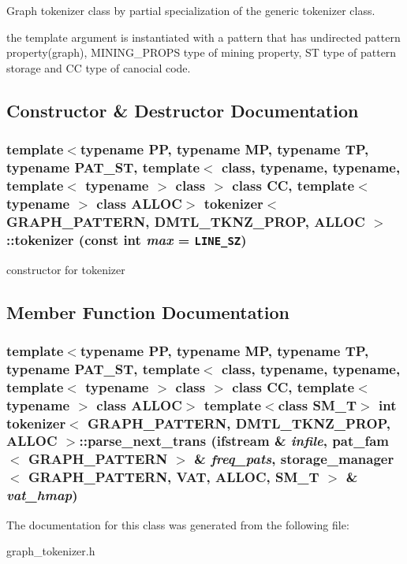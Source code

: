 Graph tokenizer class by partial specialization of the generic tokenizer class. 

the template argument is instantiated with a pattern that has undirected pattern property(graph), MINING\_\-PROPS type of mining property, ST type of pattern storage and CC type of canocial code. 



\subsection{Constructor \& Destructor Documentation}
\subsubsection{\setlength{\rightskip}{0pt plus 5cm}template$<$typename PP, typename MP, typename TP, typename PAT\_\-ST, template$<$ class, typename, typename, template$<$ typename $>$ class $>$ class CC, template$<$ typename $>$ class ALLOC$>$ \bf{tokenizer}$<$ GRAPH\_\-PATTERN, DMTL\_\-TKNZ\_\-PROP, ALLOC $>$::\bf{tokenizer} (const int {\em max} = {\tt LINE\_\-SZ})\hspace{0.3cm}{\tt  [inline]}}\label{classtokenizer_3_01GRAPH__PATTERN_00_01DMTL__TKNZ__PROP_00_01ALLOC_01_4_6b534e815d9b7bc6db390545b83f9ed5}


constructor for tokenizer 

\subsection{Member Function Documentation}
\subsubsection{\setlength{\rightskip}{0pt plus 5cm}template$<$typename PP, typename MP, typename TP, typename PAT\_\-ST, template$<$ class, typename, typename, template$<$ typename $>$ class $>$ class CC, template$<$ typename $>$ class ALLOC$>$ template$<$class SM\_\-T$>$ int \bf{tokenizer}$<$ GRAPH\_\-PATTERN, DMTL\_\-TKNZ\_\-PROP, ALLOC $>$::parse\_\-next\_\-trans (ifstream \& {\em infile}, \bf{pat\_\-fam}$<$ GRAPH\_\-PATTERN $>$ \& {\em freq\_\-pats}, \bf{storage\_\-manager}$<$ GRAPH\_\-PATTERN, \bf{VAT}, ALLOC, SM\_\-T $>$ \& {\em vat\_\-hmap})\hspace{0.3cm}{\tt  [inline]}}\label{classtokenizer_3_01GRAPH__PATTERN_00_01DMTL__TKNZ__PROP_00_01ALLOC_01_4_d0518f28456a0e7448ea7a54a108a2d4}




The documentation for this class was generated from the following file:\begin{CompactItemize}
\item 
graph\_\-tokenizer.h\end{CompactItemize}
